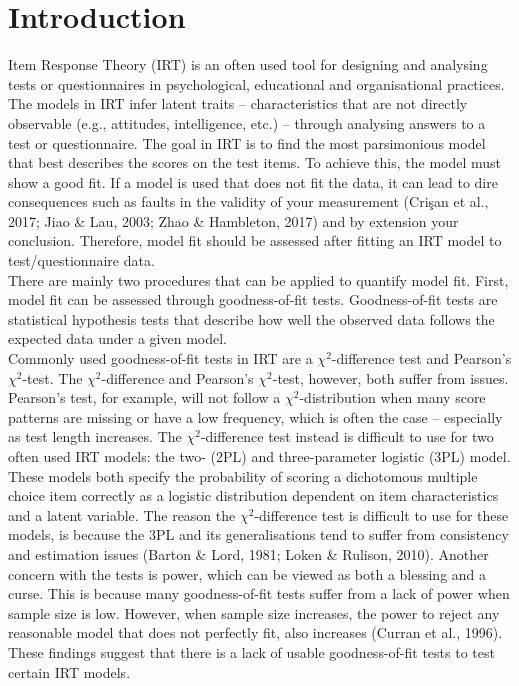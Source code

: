 \documentclass[Royal,sageapa,times,doublespace]{sagej}
\begin{document}
\section{Introduction}
Item Response Theory (IRT) is an often used tool for designing and analysing tests or questionnaires in psychological, educational and organisational practices. The models in IRT infer latent traits -- characteristics that are not directly observable (e.g., attitudes, intelligence, etc.) -- through analysing answers to a test or questionnaire. The goal in IRT is to find the most parsimonious model that best describes the scores on the test items. To achieve this, the model must show a good fit. If a model is used that does not fit the data, it can lead to dire consequences such as faults in the validity of your measurement (Cri\c{s}an et al., 2017; Jiao \& Lau, 2003; Zhao \& Hambleton, 2017) and by extension your conclusion. Therefore, model fit should be assessed after fitting an IRT model to test/questionnaire data. \\
\indent There are mainly two procedures that can be applied to quantify model fit. First, model fit can be assessed through goodness-of-fit tests. Goodness-of-fit tests are statistical hypothesis tests that describe how well the observed data follows the expected data under a given model. \\
\indent Commonly used goodness-of-fit tests in IRT are a $\chi^2$-difference test and Pearson's $\chi^2$-test. The $\chi^2$-difference and Pearson's $\chi^2$-test, however, both suffer from issues. Pearson's test, for example, will not follow a $\chi^2$-distribution when many score patterns are missing or have a low frequency, which is often the case -- especially as test length increases. The $\chi^2$-difference test instead is difficult to use for two often used IRT models: the two- (2PL) and three-parameter logistic (3PL) model. These models both specify the probability of scoring a dichotomous multiple choice item correctly as a logistic distribution dependent on item characteristics and a latent variable. The reason the $\chi^2$-difference test is difficult to use for these models, is because the 3PL and its generalisations tend to suffer from consistency and estimation issues (Barton \& Lord, 1981; Loken \& Rulison, 2010). Another concern with the tests is power, which can be viewed as both a blessing and a curse. This is because many goodness-of-fit tests suffer from a lack of power when sample size is low. However, when sample size increases, the power to reject any reasonable model that does not perfectly fit, also increases (Curran et al., 1996). These findings suggest that there is a lack of usable goodness-of-fit tests to test certain IRT models. \\
\end{document}
